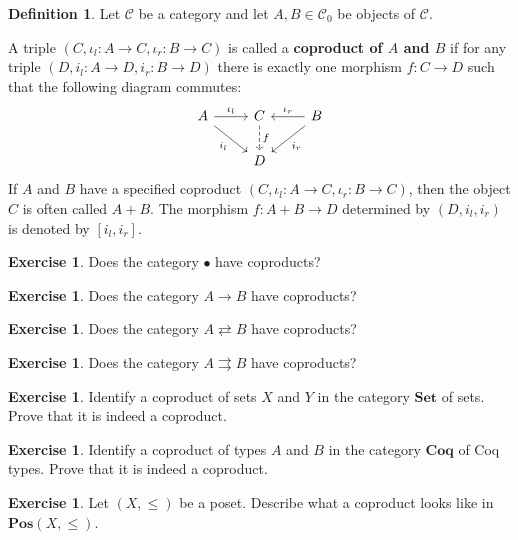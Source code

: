 \documentclass[a4paper,10pt]{scrartcl}
\theoremstyle{plain}
\theoremstyle{definition}
\newtheorem{dfn}[thm]{Definition}
\newtheorem{exer}[thm]{Exercise}
\newcommand{\Cat}[1]{\mathcal{#1}}
\newcommand{\CC}{\Cat{C}}
\newcommand{\Catb}[1]{\mathbf{#1}}
\newcommand{\SET}{\Catb{Set}}
\newcommand{\POS}{\Catb{Pos}}
\newcommand{\COQ}{\Catb{Coq}}
\newcommand{\Ob}[1]{{#1}_0}
\newcommand{\inl}{\ensuremath{\iota_l}}
\newcommand{\inr}{\ensuremath{\iota_r}}
\begin{document}
\begin{dfn}
   Let $\CC$ be a category and let $A,B \in \Ob\CC$ be objects of $\CC$.

  A triple $(C,\inl : A \to C,\inr : B \to C)$ is called a \textbf{coproduct of $A$ and $B$} if for any triple $(D,i_l : A \to D, i_r : B \to D)$ there is exactly one morphism $f : C \to D$ such that the following diagram commutes:
  \[
    \begin{tikzcd}
      A \ar[r, "\inl"] \ar[rd, "i_l"']
      &
      C  \ar[d, dashed, "f"]
      &
      B \ar[l, "\inr"'] \ar[ld, "i_r"]
      \\
      &
      D %
    \end{tikzcd}
  \]
  If $A$ and $B$ have a specified coproduct $(C,\inl : A \to C,\inr : B \to C)$, then the object $C$ is often called $A + B$.
  The morphism $f : A + B \to D$ determined by $(D, i_l, i_r)$ is denoted by $[ i_l, i_r]$.
  
\end{dfn}

\begin{exer}
  Does the category $\bullet$ have coproducts?
\end{exer}

\begin{exer}
  Does the category $A \to B$ have coproducts?
\end{exer}

\begin{exer}
  Does the category $A \rightleftarrows B$ have coproducts?
\end{exer}

\begin{exer}
  Does the category $A \rightrightarrows B$ have coproducts?
\end{exer}

\begin{exer}\label{exer:coproduct_set}
  Identify a coproduct of sets $X$ and $Y$ in the category $\SET$ of sets.
  Prove that it is indeed a coproduct.
\end{exer}

\begin{exer}
  Identify a coproduct of types $A$ and $B$ in the category $\COQ$ of Coq types.
  Prove that it is indeed a coproduct.
\end{exer}

\begin{exer}\label{exer:coproduct_posetcat}
  Let $(X,\leq)$ be a poset. Describe what a coproduct looks like in  $\POS(X,\leq)$.
\end{exer}
\end{document}
